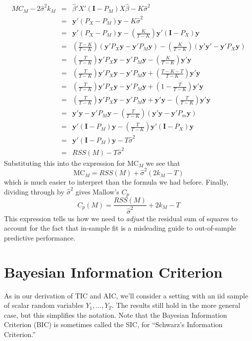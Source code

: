 \begin{eqnarray*}
	MC_M - 2\widehat{\sigma}^2k_M &=& \widehat{\beta}'X'(\mathbf{I} - P_M)X\widehat{\beta} - K\widehat{\sigma}^2\\
	&=& \mathbf{y}'(P_X - P_M)\mathbf{y} -  K\widehat{\sigma}^2\\
   &=& \mathbf{y}'(P_X - P_M)\mathbf{y} - \left(\frac{K}{T-K}\right)\mathbf{y}'\left(\mathbf{I} - P_X\right)\mathbf{y}\\
		&=& \left(\frac{T-K}{T-K}\right)(\mathbf{y}'P_X\mathbf{y} - \mathbf{y}'P_M\mathbf{y}) - \left(\frac{K}{T-K}\right)(\mathbf{y}'\mathbf{y}' - \mathbf{y}'P_X \mathbf{y})\\
			&=&\left(\frac{T}{T-K}\right)\mathbf{y}'P_X \mathbf{y} - \mathbf{y}'P_M\mathbf{y} - \left(\frac{K}{T-K} \right)\mathbf{y}'\mathbf{y}  \\
			&=& \left(\frac{T}{T-K}\right)\mathbf{y}'P_X \mathbf{y} - \mathbf{y}'P_M\mathbf{y} + \left(\frac{T - K - T}{T-K} \right)\mathbf{y}'\mathbf{y}  \\
			&=&  \left(\frac{T}{T-K} \right)\mathbf{y}'P_X \mathbf{y} - \mathbf{y}' P_M \mathbf{y} + \left(1 - \frac{T}{T-K}\right)\mathbf{y}'\mathbf{y} \\
			&=&  \left(\frac{T}{T-K} \right)\mathbf{y}'P_X \mathbf{y} - \mathbf{y}' P_M \mathbf{y} + \mathbf{y}'\mathbf{y} - \left(\frac{T}{T-K}\right)\mathbf{y}'\mathbf{y}  \\
			&=& \mathbf{y}'\mathbf{y} - \mathbf{y}'P_M\mathbf{y} - \left(\frac{T}{T-K} \right)(\mathbf{y}'\mathbf{y} - \mathbf{y}'P_m\mathbf{y})\\
			&=& \mathbf{y}'(\mathbf{I} - P_M)\mathbf{y} - \left(\frac{T}{T-K}\right)\mathbf{y}'\left(\mathbf{I} - P_X\right)\mathbf{y}\\
			&=& \mathbf{y}'(\mathbf{I} - P_M)\mathbf{y} - T\widehat{\sigma}^2\\
			&=& RSS(M) - T\widehat{\sigma}^2
      \end{eqnarray*}
Substituting this into the expression for $\mbox{MC}_M$ we see that 
	$$\mbox{MC}_M = RSS(M) + \widehat{\sigma}^2(2 k_M - T)$$
which is much easier to interpret than the formula we had before.
Finally, dividing through by $\widehat{\sigma}^2$ gives Mallow's $C_p$
	$$C_p(M) = \frac{RSS(M)}{\widehat{\sigma}^2} + 2k_M - T$$
This expression tells us how we need to \emph{adjust} the residual sum of squares to account for the fact that in-sample fit is a misleading guide to out-of-sample predictive performance.

\section{Bayesian Information Criterion}
As in our derivation of TIC and AIC, we'll consider a setting with an iid sample of scalar random variables $Y_1, \hdots, Y_T$. 
The results still hold in the more general case, but this simplifies the notation. 
Note that the Bayesian Information Criterion (BIC) is sometimes called the SIC, for ``Schwarz's Information Criterion.''

